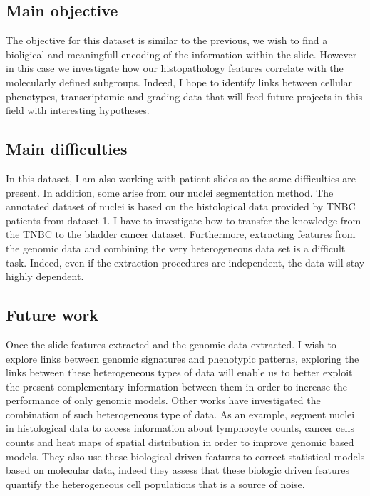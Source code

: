 \documentclass[a4paper,10pt,twocolumn]{article}
\begin{document}
\subsection{Main objective}
The objective for this dataset is similar to the previous, we wish to find a bioligical and meaningfull 
encoding of the information within the slide. However in this case we investigate how 
our histopathology features correlate with the
molecularly defined subgroups. Indeed, I hope to identify links between
cellular phenotypes, transcriptomic and grading data that will feed
future projects in this field with interesting hypotheses.


\subsection{Main difficulties}
In this dataset, I am also working with patient slides so the same difficulties are present. In addition, some arise from our nuclei segmentation method. The annotated dataset of nuclei is based on the histological data provided by TNBC patients from dataset 1. I have to investigate how to transfer the knowledge from the TNBC to the bladder cancer dataset. 
Furthermore, extracting features
from the genomic data and combining the very heterogeneous data set is
a difficult task. Indeed, even if the extraction procedures are
independent, the data will stay highly dependent. 

\subsection{Future work}

Once the slide features extracted and the genomic data extracted. I wish to explore
links between genomic signatures and phenotypic patterns, exploring
the links between these heterogeneous types of data will enable us to
better exploit the present complementary information between them in
order to increase the performance of only genomic models. Other works
have investigated the combination of such heterogeneous type of
data. As an example, \citet{yuan2012quantitative} segment nuclei in  
 histological data to access information about lymphocyte counts,
 cancer cells counts and heat maps of spatial distribution in order to
 improve genomic based models.  They also use these biological  driven
 features to correct statistical models based on molecular data,
 indeed they assess that  these biologic driven features quantify the
 heterogeneous cell populations that is a source of  noise. 
\end{document}
